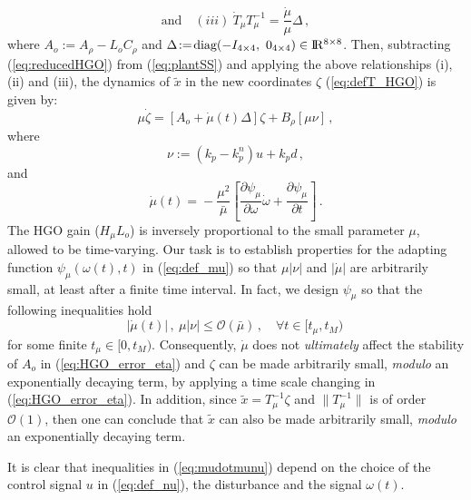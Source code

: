 \documentclass[letterpaper, 10 pt, conference]{ieeeconf}  %
\def\re{{\rm I}\! {\rm R}}
\theoremstyle{plain}
\theoremstyle{definition}
\theoremstyle{remark}
\begin{document}
$$\mbox{and} \quad
(iii) \ \dot{T}_\mu T_\mu^{-1}\!=\!\frac{\dot{\mu}}{\mu}
\Delta\,,$$
%
where $A_o\!:=\!A_\rho\!-\!L_o C_\rho$ and
$\Delta\!:=\!\mbox{diag}(-I_{4 \times 4}, \ 0_{4 \times 4}) \in \re^{8 \times 8}$.
%
Then, subtracting (\ref{eq:reducedHGO}) from
(\ref{eq:plantSS}) and applying the above
relationships (i),
(ii) and (iii), the dynamics of $\tilde{x}$ 
in the new coordinates $\zeta$ (\ref{eq:defT_HGO}) is given by:
%
\begin{equation}
\mu \dot{\zeta} = [A_o+ \dot{\mu}(t) \Delta] \zeta + B_\rho [\mu
\nu]\,, \label{eq:HGO_error_eta}
\end{equation}
%
where %
%
\begin{equation}
\nu:=(k_p-k_p^n)u+k_p d\,,\label{eq:def_nu}
\end{equation}
%
and
%
\begin{equation}
\dot{\mu}(t)\!=\!-\frac{\mu^2}{\bar{\mu}} \left[\frac{\partial
\psi_\mu}{\partial \omega} \dot{\omega}+\frac{\partial
\psi_\mu}{\partial t}\right]\,. \label{eq:def_mudot}
\end{equation}
%
The HGO gain ($H_\mu L_o$) is inversely proportional to the small parameter $\mu$,
allowed to be time-varying. %
Our task is to establish properties for the adapting
function $\psi_\mu(\omega(t),t)$ in (\ref{eq:def_mu}) so that $\mu
|\nu|$ and $|\dot{\mu}|$ are arbitrarily small, at least after a
finite time interval. In fact, we design $\psi_\mu$ so that the following inequalities hold
%
\begin{equation}
|\dot{\mu}(t)|\,, \ \mu |\nu| \leq \mathcal{O}(\bar{\mu})\,, \quad
\forall t \in [t_\mu,t_M)\, \label{eq:mudotmunu}
\end{equation}
%
for  some finite $t_\mu \in [0,t_M)$.  Consequently, $\dot{\mu}$ does not {\em
ultimately} affect the stability of $A_o$ in
(\ref{eq:HGO_error_eta}) and $\zeta$  can be made
arbitrarily small, {\em modulo} an exponentially decaying term, by applying a time scale changing in (\ref{eq:HGO_error_eta}). In addition, since $\tilde{x} = T_\mu^{-1} \zeta$ and $\|T_\mu^{-1}\|$ is of order $\mathcal{O}(1)$, then one can conclude that $\tilde{x}$ can also be made
arbitrarily small, {\em modulo} an exponentially decaying term.

It is clear that inequalities in (\ref{eq:mudotmunu}) depend on the choice of the control signal $u$ in (\ref{eq:def_nu}), the disturbance and the signal $\omega(t)$. 
\end{document}
